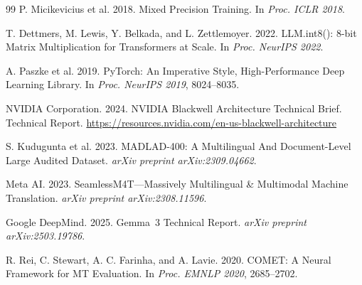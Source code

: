\documentclass[sigconf]{acmart}
\begin{document}
\begin{thebibliography}{99}
P. Micikevicius et al. 2018. Mixed Precision Training.
In \textit{Proc. ICLR 2018}.

T. Dettmers, M. Lewis, Y. Belkada, and L. Zettlemoyer. 2022.
LLM.int8(): 8-bit Matrix Multiplication for Transformers at Scale.
In \textit{Proc. NeurIPS 2022}.

A. Paszke et al. 2019. PyTorch: An Imperative Style, High-Performance Deep Learning Library.
In \textit{Proc. NeurIPS 2019}, 8024--8035.

NVIDIA Corporation. 2024. NVIDIA Blackwell Architecture Technical Brief.
Technical Report.
\url{https://resources.nvidia.com/en-us-blackwell-architecture}

S. Kudugunta et al. 2023. MADLAD-400: A Multilingual And Document-Level Large Audited Dataset.
\textit{arXiv preprint arXiv:2309.04662}.

Meta AI. 2023. SeamlessM4T---Massively Multilingual \& Multimodal Machine Translation.
\textit{arXiv preprint arXiv:2308.11596}.

Google DeepMind. 2025. Gemma~3 Technical Report.
\textit{arXiv preprint arXiv:2503.19786}.

R. Rei, C. Stewart, A. C. Farinha, and A. Lavie. 2020.
COMET: A Neural Framework for MT Evaluation.
In \textit{Proc. EMNLP 2020}, 2685--2702.

\end{thebibliography}
\end{document}

